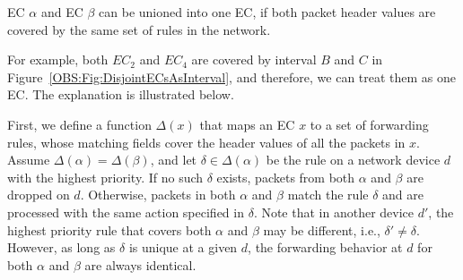 \begin{lemma}
EC $\alpha$ and EC $\beta$ can be unioned into one EC, if both packet header values are covered by the same set of rules in the network.
\label{OBS:Lemma:MergeEC}
\end{lemma}
For example, both $EC_2$ and $EC_4$ are covered by interval $B$ and $C$ in Figure~\ref{OBS:Fig:DisjointECsAsInterval}, and therefore, we can treat them as one EC. The explanation is illustrated below.

First, we define a function $\Delta(x)$ that maps an EC $x$ to a set of forwarding rules, whose matching fields cover the header values of all the packets in $x$. Assume $\Delta(\alpha) = \Delta(\beta)$, and let $\delta \in \Delta(\alpha)$ be the rule on a network device $d$ with the highest priority.
If no such $\delta$ exists, packets from both $\alpha$ and $\beta$ are dropped on $d$.
Otherwise, packets in both $\alpha$ and $\beta$ match the rule $\delta$ and are processed with the same action specified in $\delta$.
Note that in another device $d'$, the highest priority rule that covers both $\alpha$
and $\beta$ may be different, i.e., $\delta' \neq \delta$.
However, as long as $\delta$ is unique at a given $d$, the forwarding behavior at $d$ for both $\alpha$ and $\beta$ are always identical.

